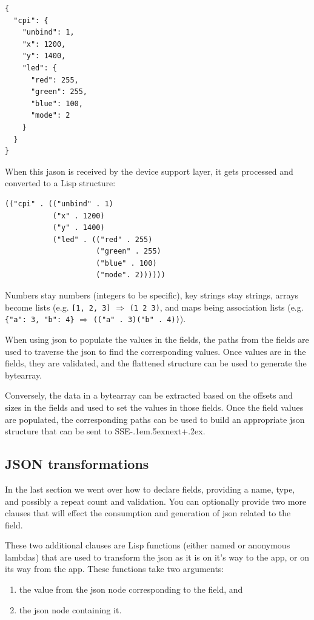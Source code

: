 \documentclass[12pt]{article}
\def\SSEnext{SSE\kern-.1em\lower.5ex\hbox{\footnotesize next}\kern+.2ex}
\begin{document}
\begin{verbatim}
{
  "cpi": {
    "unbind": 1,
    "x": 1200,
    "y": 1400,
    "led": {
      "red": 255,
      "green": 255,
      "blue": 100,
      "mode": 2
    }
  }
}
\end{verbatim}

When this jason is received by the device support layer, it gets
processed and converted to a Lisp structure: 

\begin{verbatim}
(("cpi" . (("unbind" . 1)
           ("x" . 1200)
           ("y" . 1400)
           ("led" . (("red" . 255)
                     ("green" . 255)
                     ("blue" . 100)
                     ("mode". 2))))))
\end{verbatim}

Numbers stay numbers (integers to be specific), key strings stay
strings, arrays become lists (e.g. \verb|[1, 2, 3]| $\Rightarrow$
\verb|(1 2 3)|, and maps being association lists (e.g.
\verb|{"a": 3, "b": 4}| $\Rightarrow$ \verb|(("a" . 3)("b" . 4))|).

When using json to populate the values in the fields, the paths from
the fields are used to traverse the json to find the corresponding
values. Once values are in the fields, they are validated, and the
flattened structure can be used to generate the bytearray.

Conversely, the data in a bytearray can be extracted based on the
offsets and sizes in the fields and used to set the values in those
fields. Once the field values are populated, the corresponding paths
can be used to build an appropriate json structure that can be sent to
\SSEnext. 

\subsection{JSON transformations}

In the last section we went over how to declare fields, providing a
name, type, and possibly a repeat count and validation. You can
optionally provide two more clauses that will effect the consumption and
generation of json related to the field.

These two additional clauses are Lisp functions (either named or
anonymous lambdas) that are used to transform the json as it is on
it's way to the app, or on its way from the app. These functions take
two arguments:

\begin{enumerate} 
\item the value from the json node corresponding
to the field, and
\item the json node containing it. 
\end{enumerate}
\end{document}
